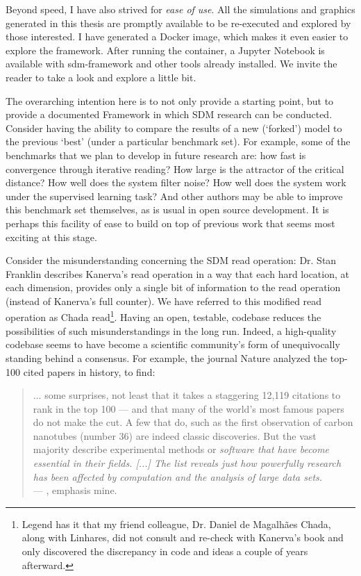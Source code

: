 Beyond speed, I have also strived for \emph{ease of use}.  All the simulations and graphics generated in this thesis are promptly available to be re-executed and explored by those interested. I have generated a Docker image, which makes it even easier to explore the framework. After running the container, a Jupyter Notebook is available with sdm-framework and other tools already installed. We invite the reader to take a look and explore a little bit.

The overarching intention here is to not only provide a starting point, but to provide a documented Framework in which SDM research can be conducted.  Consider having the ability to compare the results of a new (‘forked’) model to the previous `best' (under a particular benchmark set).  For example, some of the benchmarks that we plan to develop in future research are: how fast is convergence through iterative reading?  How large is the attractor of the critical distance?  How well does the system filter noise?  How well does the system work under the supervised learning task?  And other authors may be able to improve this benchmark set themselves, as is usual in open source development.  It is perhaps this facility of ease to build on top of previous work that seems most exciting at this stage.

Consider the misunderstanding concerning the SDM read operation:  Dr. Stan Franklin describes Kanerva's read operation in a way that each hard location, at each dimension, provides only a single bit of information to the read operation (instead of Kanerva's full counter).  We have referred to this modified read operation as Chada read\footnote{Legend has it that my friend \text{\&} colleague, Dr. Daniel de Magalhães Chada, along with Linhares, did not consult and re-check with Kanerva's book and only discovered the discrepancy in code and ideas a couple of years afterward.}.  Having an open, testable, codebase reduces the possibilities of such misunderstandings in the long run.  Indeed, a high-quality codebase seems to have become a scientific community's form of unequivocally standing behind a consensus. For example, the journal Nature analyzed the top-100 cited papers in history, to find:

\begin{quote}
... some surprises, not least that it takes a staggering 12,119 citations to rank in the top 100 — and that many of the world’s most famous papers do not make the cut. A few that do, such as the first observation of carbon nanotubes (number 36) are indeed classic discoveries. But the vast majority describe experimental methods or \emph{software that have become essential in their fields. [...] The list reveals just how powerfully research has been affected by computation and the analysis of large data sets.} \\
\hfill --- \citet{van2014top}, emphasis mine.
\end{quote}

